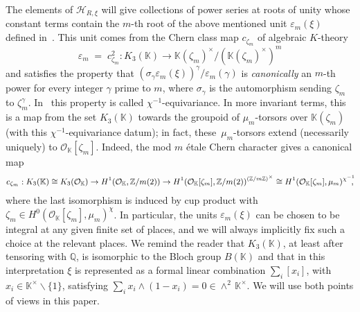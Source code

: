 \documentclass[12pt,reqno]{amsart}
\theoremstyle{definition}
\def\red#1{\textcolor[rgb]{1.00,0.00,0.00}{#1}}%
\def\BZ{\mathbb Z}
\def\BQ{\mathbb Q}
\def\BK{\mathbb K}
\def\calH{\mathcal H}
\def\s{\sigma}
\def\ve{\varepsilon}
\def\be{\begin{equation}}
\def\ee{\end{equation}}
\def\z{\zeta}
\def\calO{\mathcal{O}}
\def\={\;=\;}
\begin{document}
The elements of $\calH_{R,\xi}$ will give collections of power
series at roots of unity whose constant terms contain the
$m$-th root of the above mentioned unit $\ve_m(\xi)$ defined
\hbox{in \cite[Thm.1.5]{CGZ}}. This unit comes from the Chern class map $c_{\z_m}$
of algebraic $K$-theory
\be
\label{emdef}
\ve_m\=c_{\z_m}^2 : K_3(\BK) \to \BK(\z_m)^\times/(\BK(\z_m)^\times)^m
\ee
and satisfies the property that
$(\s_\gamma \ve_m(\xi))^\gamma/\ve_m(\gamma)$ is \emph{canonically} an
$m$-th power for every integer $\gamma$ prime to $m$, where $\s_\gamma$ is the
automorphism sending $\z_m$ to $\z_m^\gamma$.
In~\cite{CGZ} this property is called $\chi^{-1}$-equivariance.
In more invariant terms, this is a
map from the set $K_3(\BK)$ towards the groupoid of $\mu_m$-torsors over $\BK(\z_m)$
(with this $\chi^{-1}$-equivariance datum); in fact, these~\hbox{$\mu_m$-torsors}
extend (necessarily uniquely) to $\calO_{\BK}[\zeta_m]$. Indeed, the mod $m$ \'etale
Chern character gives a canonical map
\be
\begin{small}
\begin{aligned}
\label{cm}
c_{\z_m}: K_3(\BK)\cong K_3(\calO_{\BK})\to H^1(\calO_{\BK},\BZ/m(2))
\to H^1(\calO_{\BK}[\zeta_m],\BZ/m(2))^{(\BZ/m\BZ)^\times}
\cong H^1(\calO_{\BK}[\zeta_m],\mu_m)^{\chi^{-1}}\!\!\! ,
\end{aligned}
\end{small}
\ee
where the last isomorphism is induced by cup product with
$\zeta_m\in H^0(\calO_{\BK}[\zeta_m],\mu_m)^{\chi}$. In particular, the units
$\ve_m(\xi)$ can be chosen to be integral at any given finite set of places, and we
will always implicitly fix such a choice at the relevant places.
We remind the reader that $K_3(\BK)$, at least after tensoring with $\BQ$, is
isomorphic to the Bloch group $B(\BK)$ and that in this interpretation $\xi$ is
represented as a formal linear combination $\sum_i[x_i]$, with
$x_i\in\BK^{\times}\smallsetminus\{1\}$, satisfying
$\sum_{i}x_i\wedge(1-x_i)=0\in\wedge^{2}\,\BK^{\times}$.
We will use both points of views in this paper.

\end{document}
